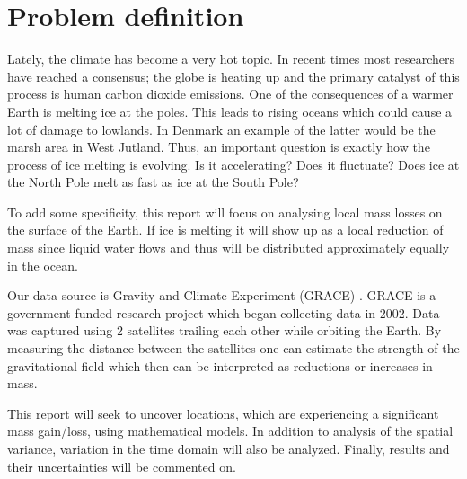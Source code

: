 \section{Problem definition}
Lately, the climate has become a very hot topic. 
In recent times most researchers have reached a consensus;
the globe is heating up and the primary catalyst of this process is human carbon dioxide emissions.
One of the consequences of a warmer Earth is melting ice at the poles.
This leads to rising oceans which could cause a lot of damage to lowlands.
In Denmark an example of the latter would be the marsh area in West Jutland.
Thus, an important question is exactly how the process of ice melting is evolving. 
Is it accelerating? Does it fluctuate? Does ice at the North Pole melt as fast as ice at the South Pole?

To add some specificity, this report will focus on analysing local mass losses on the surface of the Earth.
If ice is melting it will show up as a local reduction of mass since liquid water flows and thus will be distributed approximately equally in the ocean. 

Our data source is Gravity and Climate Experiment (GRACE) \cite{GRACE-data-source}. 
GRACE is a government funded research project which began collecting data in 2002.
Data was captured using 2 satellites trailing each other while orbiting the Earth.
By measuring the distance between the satellites one can estimate the strength of the gravitational field which then can be interpreted as reductions or increases in mass.

This report will seek to uncover locations, which are experiencing a significant mass gain/loss, using mathematical models. 
In addition to analysis of the spatial variance, variation in the time domain will also be analyzed.
Finally, results and their uncertainties will be commented on.
